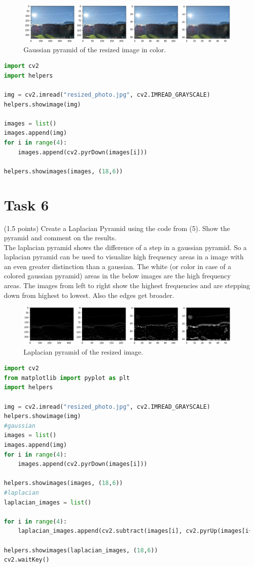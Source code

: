 \documentclass[UTF-8]{article}
\begin{document}
\begin{figure}[H]
	\centering
	\includegraphics[width=1\linewidth]{gaussian_color.png}
	\caption{Gaussian pyramid of the resized image in color.}
	\label{fig:gaussian2}
\end{figure}

\begin{lstlisting}[language=python]
import cv2
import helpers

img = cv2.imread("resized_photo.jpg", cv2.IMREAD_GRAYSCALE)
helpers.showimage(img)

images = list()
images.append(img)
for i in range(4):
	images.append(cv2.pyrDown(images[i]))

helpers.showimages(images, (18,6))
\end{lstlisting}
\newpage
\section*{Task 6}
(1.5 points) Create a Laplacian Pyramid using the code from (5). Show the pyramid and
comment on the results.
\\
The laplacian pyramid shows the difference of a step in a gaussian pyramid. So a laplacian pyramid can be used to visualize high frequency areas in a image with an even greater distinction than a gaussian. The white (or color in case of a colored gaussian pyramid) areas in the below images are the high frequency areas. The images from left to right show the highest frequencies and are stepping down from highest to lowest. Also the edges get broader.
\begin{figure}[H]
	\centering
	\includegraphics[width=1\linewidth]{laplacian}
	\caption{Laplacian pyramid of the resized image.}
	\label{fig:laplacian}
\end{figure}

\begin{lstlisting}[language=python]
import cv2
from matplotlib import pyplot as plt
import helpers

img = cv2.imread("resized_photo.jpg", cv2.IMREAD_GRAYSCALE)
helpers.showimage(img)
#gaussian
images = list()
images.append(img)
for i in range(4):
	images.append(cv2.pyrDown(images[i]))

helpers.showimages(images, (18,6))
#laplacian
laplacian_images = list()

for i in range(4):
	laplacian_images.append(cv2.subtract(images[i], cv2.pyrUp(images[i+1])))

helpers.showimages(laplacian_images, (18,6))
cv2.waitKey()
\end{lstlisting}
\end{document}
